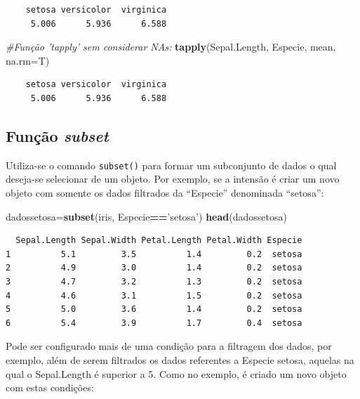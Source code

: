 \documentclass[12pt,brazil,oneside]{book}
\newenvironment{Shaded}{\begin{snugshade}}{\end{snugshade}}
\newcommand{\CommentTok}[1]{\textcolor[rgb]{0.56,0.35,0.01}{\textit{#1}}}
\newcommand{\DataTypeTok}[1]{\textcolor[rgb]{0.13,0.29,0.53}{#1}}
\newcommand{\KeywordTok}[1]{\textcolor[rgb]{0.13,0.29,0.53}{\textbf{#1}}}
\newcommand{\NormalTok}[1]{#1}
\newcommand{\OperatorTok}[1]{\textcolor[rgb]{0.81,0.36,0.00}{\textbf{#1}}}
\newcommand{\StringTok}[1]{\textcolor[rgb]{0.31,0.60,0.02}{#1}}
\begin{document}
\begin{verbatim}
    setosa versicolor  virginica 
     5.006      5.936      6.588 
\end{verbatim}

\begin{Shaded}
\begin{Highlighting}[]
\CommentTok{#Função 'tapply' sem considerar NAs:}
\KeywordTok{tapply}\NormalTok{(Sepal.Length, Especie, mean, }\DataTypeTok{na.rm=}\NormalTok{T)}
\end{Highlighting}
\end{Shaded}

\begin{verbatim}
    setosa versicolor  virginica 
     5.006      5.936      6.588 
\end{verbatim}

\hypertarget{funcao-subset}{%
\subsection{\texorpdfstring{Função \emph{subset}}{Função subset}}\label{funcao-subset}}

Utiliza-se o comando \texttt{subset()} para formar um subconjunto de dados o qual deseja-se selecionar de um objeto. Por exemplo, se a intensão é criar um novo objeto com somente os dados filtrados da ``Especie'' denominada ``setosa'':

\begin{Shaded}
\begin{Highlighting}[]
\NormalTok{dadossetosa=}\KeywordTok{subset}\NormalTok{(iris, Especie}\OperatorTok{==}\StringTok{'setosa'}\NormalTok{)}
\KeywordTok{head}\NormalTok{(dadossetosa)}
\end{Highlighting}
\end{Shaded}

\begin{verbatim}
  Sepal.Length Sepal.Width Petal.Length Petal.Width Especie
1          5.1         3.5          1.4         0.2  setosa
2          4.9         3.0          1.4         0.2  setosa
3          4.7         3.2          1.3         0.2  setosa
4          4.6         3.1          1.5         0.2  setosa
5          5.0         3.6          1.4         0.2  setosa
6          5.4         3.9          1.7         0.4  setosa
\end{verbatim}

Pode ser configurado mais de uma condição para a filtragem dos dados, por exemplo, além de serem filtrados os dados referentes a Especie setosa, aquelas na qual o Sepal.Length é superior a 5. Como no exemplo, é criado um novo objeto com estas condições:
\end{document}
